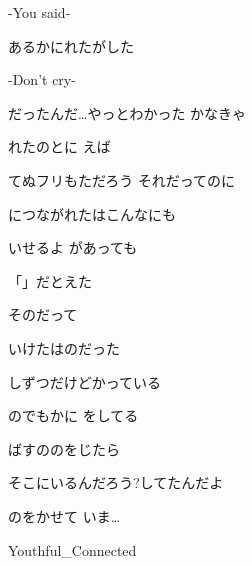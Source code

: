 \documentclass[14pt]{ltjsarticle}
\begin{document}
{  
-You said-
  \jisho{}

  
あるかにれたがした
  \jisho{}

  
-Don't cry-
  \jisho{}

\item
  だったんだ…やっとわかった かなきゃ
  \jisho{}

\item
  れたのとに えば
  \jisho{}

  てぬフリもただろう それだってのに
  \jisho{}

\item
  につながれたはこんなにも
  \jisho{}

  いせるよ があっても
  \jisho{}

  
「」だとえた
  \jisho{}

\item
   そのだって
  \jisho{}

  いけたはのだった
  \jisho{}

\item
  しずつだけどかっている
  \jisho{}

  のでもかに をしてる
  \jisho{}

\item
  ばすののをじたら
  \jisho{}

  
そこにいるんだろう?してたんだよ
  \jisho{}

  のをかせて いま…
  \jisho{}

\item
  
Youthful_Connected
  \jisho{}

  
}
\end{document}
